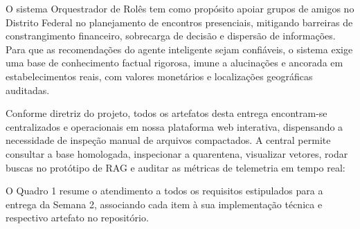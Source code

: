 \documentclass[12pt,a4paper]{article}
\begin{document}
O sistema Orquestrador de Rolês tem como propósito apoiar grupos de amigos no Distrito Federal no planejamento de encontros presenciais, mitigando barreiras de constrangimento financeiro, sobrecarga de decisão e dispersão de informações. Para que as recomendações do agente inteligente sejam confiáveis, o sistema exige uma base de conhecimento factual rigorosa, imune a alucinações e ancorada em estabelecimentos reais, com valores monetários e localizações geográficas auditadas.

Conforme diretriz do projeto, todos os artefatos desta entrega encontram-se centralizados e operacionais em nossa plataforma web interativa, dispensando a necessidade de inspeção manual de arquivos compactados. A central permite consultar a base homologada, inspecionar a quarentena, visualizar vetores, rodar buscas no protótipo de RAG e auditar as métricas de telemetria em tempo real:

\begin{center}
\end{center}

O Quadro 1 resume o atendimento a todos os requisitos estipulados para a entrega da Semana 2, associando cada item à sua implementação técnica e respectivo artefato no repositório.
\end{document}
